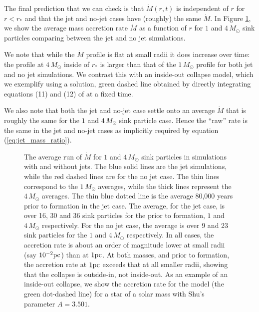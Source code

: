 \documentclass[../dissertation.tex]{subfiles}
\begin{document}
The final prediction that we can check is that $\dot{M}(r,t)$ is independent of $r$ for $r < r_*$ and that the jet and no-jet cases have (roughly) the same $\dot{M}$.
In Figure \ref{fig:jet_mdot_shu}, we show the average mass accretion rate $\dot{M}$ as a function of $r$ for $1$ and $4 \, M_\odot$ sink particles comparing between the jet and no jet simulations.

We note that while the $\dot{M}$ profile is flat at small radii it does increase over time: the profile at $4 \, M_\odot$ inside of $r_*$ is larger than that of the $1 \, M_\odot$ profile for both jet and no jet simulations.
We contrast this with an inside-out collapse model, which we exemplify using a \citet{1977ApJ...214..488S} solution, green dashed line obtained by directly integrating equations (11) and (12) of \citet{1977ApJ...214..488S} at a fixed time.

We also note that both the jet and no-jet case settle onto an average $\dot{M}$ that is roughly the same for the  $1$ and $4 \, M_\odot$ sink particle case.  Hence the ``raw'' rate is the same in the jet and no-jet cases as implicitly required by equation (\ref{eq:jet_mass_ratio}).
%
\begin{figure}[htb] %
  \caption[Jet - $\dot{M}$ profile]{The average run of $\dot{M}$ for $1$ and $4 \, M_\odot$ sink particles in simulations with and without jets. The blue solid lines are the jet simulations, while the red dashed lines are for the no jet case. The thin lines correspond to the $1 \, M_\odot$ averages, while the thick lines represent the $4 \, M_\odot$ averages. The thin blue dotted line is the average 80,000 years prior to formation in the jet case. The average, for the jet case, is over 16, 30 and 36 sink particles for the prior to formation, $1$ and $4 \, M_\odot$ respectively. For the no jet case, the average is over 9 and 23 sink particles for the $1$ and $4 \, M_\odot$ respectively. In all cases, the accretion rate is about an order of magnitude  lower at small radii (say $10^{-2} \rm{pc}$) than at $1 \rm{pc}$. At both masses, and prior to formation, the accretion rate at $1 \rm{pc}$ exceeds that at all smaller radii, showing that the collapse is outside-in, not inside-out. As an example of an inside-out collapse, we show the accretion rate for the \citet{1977ApJ...214..488S} model (the green dot-dashed line) for a star of a solar mass with Shu's parameter $A = 3.501$.  %
    }
    \label{fig:jet_mdot_shu}
\end{figure}
%
\end{document}
